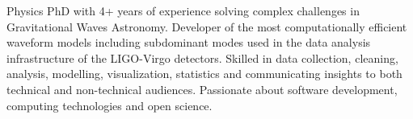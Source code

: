 
\begin{cvpubs}
  \cvpub
    {
      \begin{cvlist}
  \item {Physics PhD with 4+ years of experience solving complex challenges in Gravitational Waves Astronomy. Developer of the most computationally efficient waveform models including subdominant modes used in the data analysis infrastructure of the LIGO-Virgo detectors. Skilled in data collection, cleaning, analysis, modelling, visualization, statistics and communicating insights to both technical and non-technical audiences. Passionate about software development, computing technologies and open science.}
      \end{cvlist}
    }
\end{cvpubs}%

